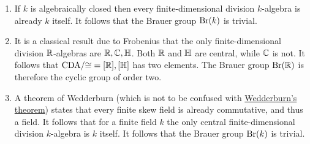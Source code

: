 \begin{example}
  \leavevmode
  \begin{enumerate}
    \item
      If $k$ is algebraically closed then every finite-dimensional division $k$-algebra is already $k$ itself.
      It follows that the Brauer group $\operatorname{Br}(k)$ is trivial.
    \item
      It is a classical result due to Frobenius that the only finite-dimensional division $\mathbb{R}$-algebras are $\mathbb{R}, \mathbb{C}, \mathbb{H}$.
      Both $\mathbb{R}$ and $\mathbb{H}$ are central, while $\mathbb{C}$ is not.
      It follows that $\operatorname{CDA}\!/{\cong} = {[\mathbb{R}], [\mathbb{H}]}$ has two elements.
      The Brauer group $\operatorname{Br}(\mathbb{R})$ is therefore the cyclic group of order two.
    \item
      A theorem of Wedderburn (which is not to be confused with \hyperref[theorem: wedderburns theorem]{Wedderburn’s theorem}) states that every finite skew field is already commutative, and thus a field.
      It follows that for a finite field $k$ the only central finite-dimensional division $k$-algebra is $k$ itself.
      It follows that the Brauer group $\operatorname{Br}(k)$ is trivial.
  \end{enumerate}
\end{example}




